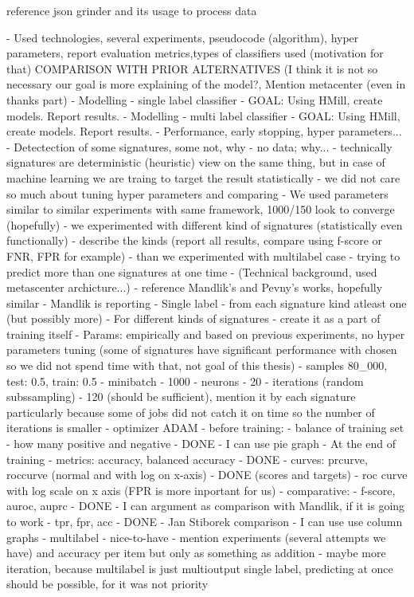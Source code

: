 reference json grinder and its usage to process data

- Used technologies, several experiments, pseudocode (algorithm), hyper parameters, report evaluation metrics,types of classifiers used (motivation for that) COMPARISON WITH PRIOR ALTERNATIVES (I think it is not so necessary our goal is more explaining of the model?, Mention metacenter (even in thanks part)
  - Modelling - single label classifier
    - GOAL: Using HMill, create models. Report results.
  - Modelling - multi label classifier
    - GOAL: Using HMill, create models. Report results.
  - Performance, early stopping, hyper parameters...
  - Detectection of some signatures, some not, why - no data; why...
    - technically signatures are deterministic (heuristic) view on the same thing, but in case of machine learning we are traing to target the result statistically
    - we did not care so much about tuning hyper parameters and comparing
       - We used parameters similar to similar experiments with same framework, 1000/150 look to converge (hopefully)
       - we experimented with different kind of signatures (statistically even functionally) - describe the kinds (report all results, compare using f-score or FNR, FPR for example)
       - than we experimented with multilabel case - trying to predict more than one signatures at one time
  - (Technical background, used metascenter archicture...)
  - reference Mandlik's and Pevny's works, hopefully similar
    - Mandlik is reporting
      - Single label - from each signature kind atleast one (but possibly more) - For different kinds of signatures - create it as a part of training itself
        - Params: empirically and based on previous experiments, no hyper parameters tuning (some of signatures have significant performance with chosen so we did not spend time with that, not goal of this thesis)
            - samples 80_000, test: 0.5, train: 0.5
            - minibatch - 1000
            - neurons - 20
            - iterations (random subssampling) - 120 (should be sufficient), mention it by each signature particularly because some of jobs did not catch it on time so the number of iterations is smaller
            - optimizer ADAM
        - before training:
            - balance of training set - how many positive and negative - DONE
                - I can use pie graph
        - At the end of training
            - metrics: accuracy, balanced accuracy - DONE
            - curves: prcurve, roccurve (normal and with log on x-axis) - DONE (scores and targets)
                - roc curve with log scale on x axis (FPR is more inportant for us)
            - comparative: 
                - f-score, auroc, auprc - DONE
                    - I can argument as comparison with Mandlik, if it is going to work
                - tpr, fpr, acc - DONE
                    - Jan Stiborek comparison
                    - I can use use column graphs
        - multilabel - nice-to-have
            - mention experiments (several attempts we have) and accuracy per item but only as something as addition - maybe more iteration, because multilabel is just multioutput single label, predicting at once should be possible, for it was not priority



